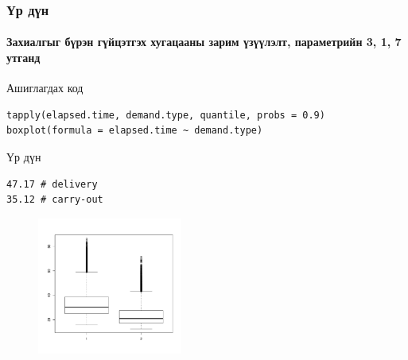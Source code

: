 \documentclass{beamer}
\begin{document}
\begin{frame}[fragile]
\frametitle{Үр дүн}\framesubtitle{Захиалгыг бүрэн гүйцэтгэх хугацааны зарим үзүүлэлт, параметрийн 3, 1, 7 утганд}
Ашиглагдах код
\begin{lstlisting}[keywords={tapply,boxplot}]
tapply(elapsed.time, demand.type, quantile, probs = 0.9)
boxplot(formula = elapsed.time ~ demand.type)
\end{lstlisting}
Үр дүн
\begin{lstlisting}[keywords={tapply,boxplot}]
47.17 # delivery
35.12 # carry-out
\end{lstlisting}
\vskip-8mm
\begin{figure}
\includegraphics[width=0.425\textwidth]{boxplot}
\end{figure}
\end{frame}

\frame
{
\begin{center}
\scalebox{10}{\color{darkred}\faSmileO}
\end{center}
}
\end{document}
